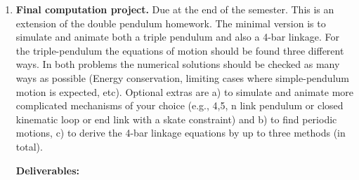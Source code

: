 \documentclass[11pt]{article}
\def\Rtensor{\underline{\underline{\mathbf R}}}
\begin{document}
\begin{enumerate}
\begin{enumerate}[\bf a)]
\item  Given $\vr$ and the $\ue_i$ what is $[\vr]_{\cal F}$ = the column vector of the components of $\vr$ using the base vectors from $\cal F$?
Answer: $[\vr]_{\cal F}=\left[\begin{array}{c}\vr\cdot \ue_1 \\\vr\cdot \ue_2 \\\vr\cdot \ue_3\end{array}\right]$.


\item  Given $\Rtensor$ and the  $\ue_{i}$ find $R_{ij}$?  Answer:  $R_{ij} = \ue_{i}\cdot \Rtensor \cdot \ue_{j}$.

\item Given the $\ue_i$ and the $\ue'_i$ find $R_{ij}$?

\item  Given $R_{ij}$ and $r_i$ find $r^*_{i}$?

\item  Given $R_{ij}$ and $r_i$ find $r^*_{{\cal B}i}$?

\item  Given $R_{ij}$ and $r^*_{i}$ find $r_{i}$?

\item Given $R_{ij}$ and $r^*_i$ find $r_{{\cal B}i}$?

\item Given $R_{ij}$ find $R_{{\cal B}ij}$?

\item  Write $[\vr^*]_{\cal F}$ as many different ways as you can.

\item  Given $\underline{\underline{\mathbf A}}= R_{ij}\ue'_i\ue'_j$,  find  $A_{ij}$. Note,  $\underline{\underline{\mathbf A}}= A_{ij}\ue_i\ue_j$.

\item Pose and answer a few questions, of the general type above, that most test your remnent confusions.

\end{enumerate}

\item \textbf{Final computation project.}\label{HWfinalproject} Due at the end of the semester.
This is an extension of the double pendulum homework.  The minimal version is to simulate and animate both a triple pendulum and also a 4-bar linkage. For the triple-pendulum the equations of motion should be found three different ways. In both problems the numerical solutions should be checked as many ways as possible (Energy conservation, limiting cases where simple-pendulum motion is expected, etc). Optional extras are a) to simulate and animate more complicated mechanisms of your choice (e.g., 4,5, n link pendulum or closed kinematic loop or end link with a skate constraint) and b) to find periodic motions, c) to derive the 4-bar linkage equations by up to three methods (in total). 
\par
\medskip
\textbf{Deliverables:}


\end{enumerate}
\end{document}
